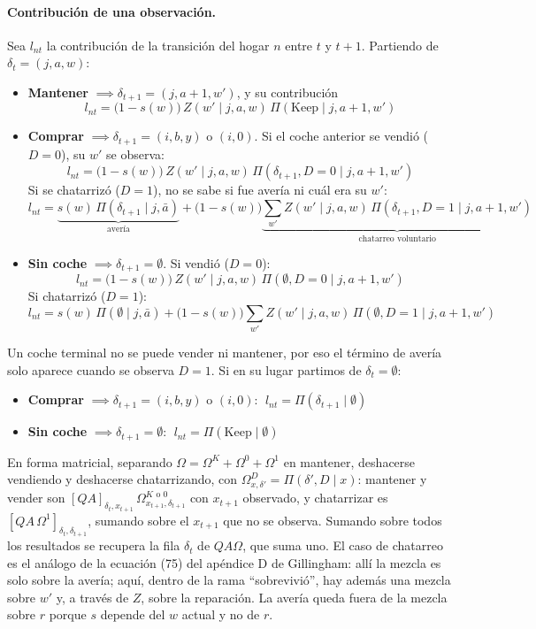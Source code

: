 \documentclass{article}
\begin{document}
\paragraph{Contribución de una observación.} Sea $l_{nt}$ la contribución de la transición del hogar $n$ entre $t$ y $t+1$. Partiendo de $\delta_t=(j,a,w)$:
\begin{itemize}
    \item \textbf{Mantener} $\implies\delta_{t+1}=(j,a+1,w')$, y su contribución
    $$l_{nt}=\big(1-s(w)\big)\,Z(w'\mid j,a,w)\,\Pi(\text{Keep}\mid j,a+1,w')$$
    \item \textbf{Comprar} $\implies\delta_{t+1}=(i,b,y)$ o $(i,0)$. Si el coche anterior se vendió ($D=0$), su $w'$ se observa:
    $$l_{nt}=\big(1-s(w)\big)\,Z(w'\mid j,a,w)\,\Pi(\delta_{t+1},D=0\mid j,a+1,w')$$
    Si se chatarrizó ($D=1$), no se sabe si fue avería ni cuál era su $w'$:
    $$l_{nt}=\underbrace{s(w)\,\Pi(\delta_{t+1}\mid j,\bar{a})}_{\text{avería}}+\big(1-s(w)\big)\underbrace{\sum_{w'}Z(w'\mid j,a,w)\,\Pi(\delta_{t+1},D=1\mid j,a+1,w')}_{\text{chatarreo voluntario}}$$
    \item \textbf{Sin coche} $\implies\delta_{t+1}=\emptyset$. Si vendió ($D=0$):
    $$l_{nt}=\big(1-s(w)\big)\,Z(w'\mid j,a,w)\,\Pi(\emptyset,D=0\mid j,a+1,w')$$
    Si chatarrizó ($D=1$):
    $$l_{nt}=s(w)\,\Pi(\emptyset\mid j,\bar{a})+\big(1-s(w)\big)\sum_{w'}Z(w'\mid j,a,w)\,\Pi(\emptyset,D=1\mid j,a+1,w')$$
\end{itemize}
Un coche terminal no se puede vender ni mantener, por eso el término de avería solo aparece cuando se observa $D=1$. Si en su lugar partimos de $\delta_t=\emptyset$:
\begin{itemize}
    \item \textbf{Comprar} $\implies\delta_{t+1}=(i,b,y)$ o $(i,0)$: $\;l_{nt}=\Pi(\delta_{t+1}\mid\emptyset)$
    \item \textbf{Sin coche} $\implies\delta_{t+1}=\emptyset$: $\;l_{nt}=\Pi(\text{Keep}\mid\emptyset)$
\end{itemize}

En forma matricial, separando $\Omega=\Omega^{K}+\Omega^{0}+\Omega^{1}$ en mantener, deshacerse vendiendo y deshacerse chatarrizando, con $\Omega^{D}_{x,\delta'}=\Pi(\delta',D\mid x)$: mantener y vender son $[QA]_{\delta_t,x_{t+1}}\,\Omega^{K\text{ o }0}_{x_{t+1},\delta_{t+1}}$ con $x_{t+1}$ observado, y chatarrizar es $[QA\,\Omega^{1}]_{\delta_t,\delta_{t+1}}$, sumando sobre el $x_{t+1}$ que no se observa. Sumando sobre todos los resultados se recupera la fila $\delta_t$ de $QA\Omega$, que suma uno. El caso de chatarreo es el análogo de la ecuación (75) del apéndice D de Gillingham: allí la mezcla es solo sobre la avería; aquí, dentro de la rama ``sobrevivió'', hay además una mezcla sobre $w'$ y, a través de $Z$, sobre la reparación. La avería queda fuera de la mezcla sobre $r$ porque $s$ depende del $w$ actual y no de $r$.
\end{document}
